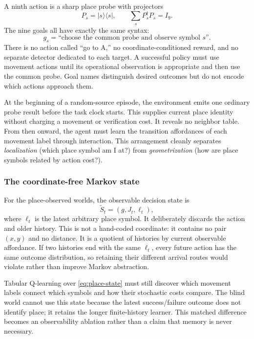 \documentclass[11pt]{article}
\begin{document}
A ninth action is a sharp place probe with projectors
\begin{equation}
 P_s=|s\rangle\!\langle s|,\qquad
 \sum_sP_s^\dagger P_s=I_9.
 \label{eq:place-probe}
\end{equation}
The nine goals all have exactly the same syntax:
\begin{equation}
 g_s=\text{``choose the common probe and observe symbol $s$''.}
 \label{eq:place-goal}
\end{equation}
There is no action called ``go to A,'' no coordinate-conditioned reward, and
no separate detector dedicated to each target. A successful policy must use
movement actions until its operational observation is appropriate and then use
the common probe. Goal names distinguish desired outcomes but do not encode
which actions approach them.

At the beginning of a random-source episode, the environment emits one ordinary
probe result before the task clock starts. This supplies current place identity
without charging a movement or verification cost. It reveals no neighbor
table. From then onward, the agent must learn the transition affordances of
each movement label through interaction. This arrangement cleanly separates
\emph{localization} (which place symbol am I at?) from \emph{geometrization}
(how are place symbols related by action cost?).

\subsubsection{The coordinate-free Markov state}

For the place-observed worlds, the observable decision state is
\begin{equation}
 \widetilde S_t=(g,J_t,\ell_t),
 \label{eq:place-state}
\end{equation}
where $\ell_t$ is the latest arbitrary place symbol. It deliberately discards
the action and older history. This is not a hand-coded coordinate: it contains
no pair $(x,y)$ and no distance. It is a quotient of histories by current
observable affordance. If two histories end with the same $\ell_t$, every
future action has the same outcome distribution, so retaining their different
arrival routes would violate rather than improve Markov abstraction.

Tabular Q-learning over \cref{eq:place-state} must still discover which
movement labels connect which symbols and how their stochastic costs compare.
The blind world cannot use this state because the latest success/failure
outcome does not identify place; it retains the longer finite-history learner.
This matched difference becomes an observability ablation rather than a claim
that memory is never necessary.
\end{document}
